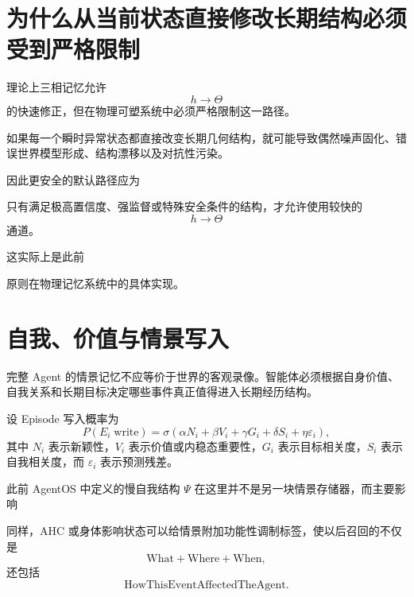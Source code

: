 \section{为什么从当前状态直接修改长期结构必须受到严格限制}

理论上三相记忆允许
\[
h\rightarrow\Theta
\]
的快速修正，但在物理可塑系统中必须严格限制这一路径。

如果每一个瞬时异常状态都直接改变长期几何结构，就可能导致偶然噪声固化、错误世界模型形成、结构漂移以及对抗性污染。

因此更安全的默认路径应为
\begin{statementbox}
\centering
{}
\end{statementbox}

只有满足极高置信度、强监督或特殊安全条件的结构，才允许使用较快的
\[
h\rightarrow\Theta
\]
通道。

这实际上是此前
\begin{statementbox}
\centering
{}
\end{statementbox}
原则在物理记忆系统中的具体实现。

\section{自我、价值与情景写入}

完整 Agent 的情景记忆不应等价于世界的客观录像。智能体必须根据自身价值、自我关系和长期目标决定哪些事件真正值得进入长期经历结构。

设 Episode 写入概率为
\[
P(E_i\;\mathrm{write})
=
\sigma
\left(
\alpha N_i
+
\beta V_i
+
\gamma G_i
+
\delta S_i
+
\eta\varepsilon_i
\right),
\]
其中 $N_i$ 表示新颖性，$V_i$ 表示价值或内稳态重要性，$G_i$ 表示目标相关度，$S_i$ 表示自我相关度，而 $\varepsilon_i$ 表示预测残差。

此前 AgentOS 中定义的慢自我结构 $\Psi$ 在这里并不是另一块情景存储器，而主要影响
\begin{statementbox}
\centering
{}
\end{statementbox}

同样，AHC 或身体影响状态可以给情景附加功能性调制标签，使以后召回的不仅是
\[
\mathrm{What}
+
\mathrm{Where}
+
\mathrm{When},
\]
还包括
\[
\mathrm{HowThisEventAffectedTheAgent}.
\]

